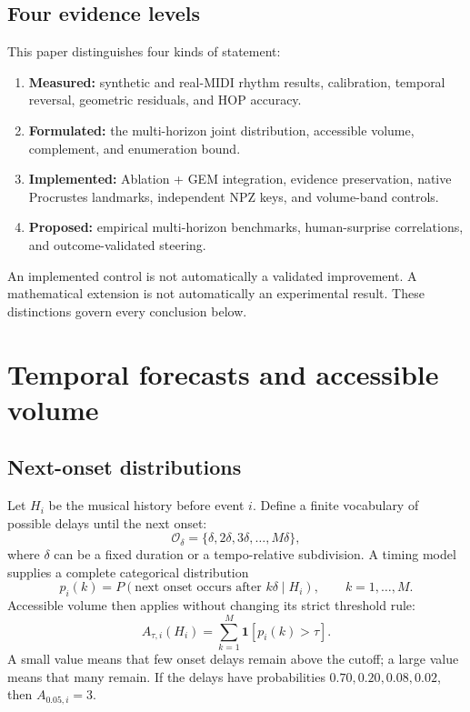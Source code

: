 \documentclass[11pt,a4paper]{article}
\begin{document}
\subsection{Four evidence levels}
This paper distinguishes four kinds of statement:
\begin{enumerate}[nosep]
  \item \textbf{Measured:} synthetic and real-MIDI rhythm results, calibration, temporal reversal, geometric residuals, and HOP accuracy.
  \item \textbf{Formulated:} the multi-horizon joint distribution, accessible volume, complement, and enumeration bound.
  \item \textbf{Implemented:} Ablation + GEM integration, evidence preservation, native Procrustes landmarks, independent NPZ keys, and volume-band controls.
  \item \textbf{Proposed:} empirical multi-horizon benchmarks, human-surprise correlations, and outcome-validated steering.
\end{enumerate}
An implemented control is not automatically a validated improvement. A mathematical extension is not automatically an experimental result. These distinctions govern every conclusion below.

\section{Temporal forecasts and accessible volume}
\subsection{Next-onset distributions}
Let $H_i$ be the musical history before event $i$. Define a finite vocabulary of possible delays until the next onset:
\begin{equation}
\mathcal{O}_\delta=\{\delta,2\delta,3\delta,\ldots,M\delta\},
\end{equation}
where $\delta$ can be a fixed duration or a tempo-relative subdivision. A timing model supplies a complete categorical distribution
\begin{equation}
p_i(k)=P(\text{next onset occurs after }k\delta\mid H_i),\qquad k=1,\ldots,M.
\end{equation}
Accessible volume then applies without changing its strict threshold rule:
\begin{equation}
A_{\tau,i}(H_i)=\sum_{k=1}^{M}\mathbf{1}\!\left[p_i(k)>\tau\right].
\label{eq:onset-volume}
\end{equation}
A small value means that few onset delays remain above the cutoff; a large value means that many remain. If the delays have probabilities $0.70,0.20,0.08,0.02$, then $A_{0.05,i}=3$.
\end{document}

